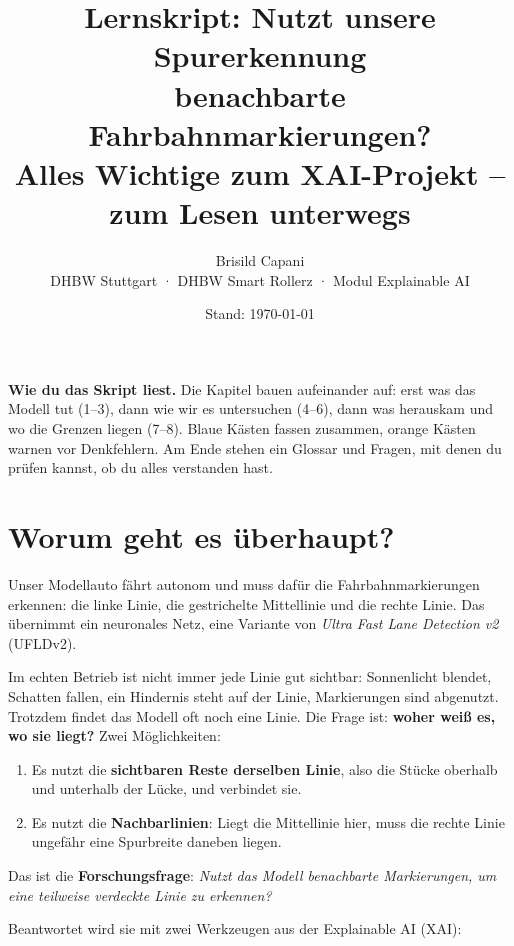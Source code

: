 \documentclass[11pt,a4paper]{article}
\title{\textbf{Lernskript: Nutzt unsere Spurerkennung\\ benachbarte Fahrbahnmarkierungen?}\\[4pt]
\large Alles Wichtige zum XAI-Projekt -- zum Lesen unterwegs}
\author{Brisild Capani\\\small DHBW Stuttgart · DHBW Smart Rollerz · Modul Explainable AI}
\date{Stand: \today}
\begin{document}
\maketitle

\begin{center}
\begin{minipage}{0.86\textwidth}
\small
\textbf{Wie du das Skript liest.} Die Kapitel bauen aufeinander auf: erst was das Modell tut
(1--3), dann wie wir es untersuchen (4--6), dann was herauskam und wo die Grenzen liegen
(7--8). Blaue Kästen fassen zusammen, orange Kästen warnen vor Denkfehlern. Am Ende stehen ein
Glossar und Fragen, mit denen du prüfen kannst, ob du alles verstanden hast.
\end{minipage}
\end{center}

\tableofcontents
\newpage

\section{Worum geht es überhaupt?}

Unser Modellauto fährt autonom und muss dafür die Fahrbahnmarkierungen erkennen: die linke
Linie, die gestrichelte Mittellinie und die rechte Linie. Das übernimmt ein neuronales Netz,
eine Variante von \emph{Ultra Fast Lane Detection v2} (UFLDv2).

Im echten Betrieb ist nicht immer jede Linie gut sichtbar: Sonnenlicht blendet, Schatten fallen,
ein Hindernis steht auf der Linie, Markierungen sind abgenutzt. Trotzdem findet das Modell oft
noch eine Linie. Die Frage ist: \textbf{woher weiß es, wo sie liegt?} Zwei Möglichkeiten:

\begin{enumerate}
  \item Es nutzt die \textbf{sichtbaren Reste derselben Linie}, also die Stücke oberhalb und
        unterhalb der Lücke, und verbindet sie.
  \item Es nutzt die \textbf{Nachbarlinien}: Liegt die Mittellinie hier, muss die rechte Linie
        ungefähr eine Spurbreite daneben liegen.
\end{enumerate}

Das ist die \textbf{Forschungsfrage}: \emph{Nutzt das Modell benachbarte Markierungen, um eine
teilweise verdeckte Linie zu erkennen?}

Beantwortet wird sie mit zwei Werkzeugen aus der Explainable AI (XAI):
\end{document}
